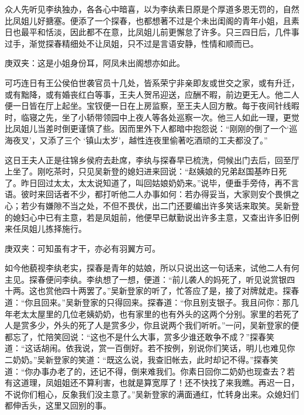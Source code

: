 \begin{parag}
    众人先听见李纨独办，各各心中暗喜，以为李纨素日原是个厚道多恩无罚的，自然比凤姐儿好搪塞。便添了一个探春，也都想著不过是个未出闺阁的青年小姐，且素日也最平和恬淡，因此都不在意，比凤姐儿前更懈怠了许多。只三四日后，几件事过手，渐觉探春精细处不让凤姐，只不过是言语安静，性情和顺而已。\begin{note}庚双夹：这是小姐身份耳，阿凤未出阁想亦如此。\end{note}可巧连日有王公侯伯世袭官员十几处，皆系荣宁非亲即友或世交之家，或有升迁，或有黜降，或有婚丧红白等事，王夫人贺吊迎送，应酬不暇，前边更无人。他二人便一日皆在厅上起坐。宝钗便一日在上房监察，至王夫人回方散。每于夜间针线暇时，临寝之先，坐了小轿带领园中上夜人等各处巡察一次。他三人如此一理，更觉比凤姐儿当差时倒更谨慎了些。因而里外下人都暗中抱怨说：“刚刚的倒了一个‘巡海夜叉’，又添了三个 ‘镇山太岁’，越性连夜里偷著吃酒顽的工夫都没了。”
\end{parag}


\begin{parag}
    这日王夫人正是往锦乡侯府去赴席，李纨与探春早已梳洗，伺候出门去后，回至厅上坐了。刚吃茶时，只见吴新登的媳妇进来回说：“赵姨娘的兄弟赵国基昨日死了。昨日回过太太，太太说知道了，叫回姑娘奶奶来。”说毕，便垂手旁侍，再不言语。彼时来回话者不少，都打听他二人办事如何：若办得妥当，大家则安个畏惧之心；若少有嫌隙不当之处，不但不畏伏，出二门还要编出许多笑话来取笑。吴新登的媳妇心中已有主意，若是凤姐前，他便早已献勤说出许多主意，又查出许多旧例来任凤姐儿拣择施行。\begin{note}庚双夹：可知虽有才干，亦必有羽翼方可。\end{note}如今他藐视李纨老实，探春是青年的姑娘，所以只说出这一句话来，试他二人有何主见。探春便问李纨。李纨想了一想，便道：“前儿袭人的妈死了，听见说赏银四十两。这也赏他四十两罢了。”吴新登家的听了，忙答应了是，接了对牌就走。探春道：“你且回来。”吴新登家的只得回来。探春道：“你且别支银子。我且问你：那几年老太太屋里的几位老姨奶奶，也有家里的也有外头的这两个分别。家里的若死了人是赏多少，外头的死了人是赏多少，你且说两个我们听听。”一问，吴新登家的便都忘了，忙陪笑回说：“这也不是什么大事，赏多少谁还敢争不成？”探春笑道：“这话胡闹。依我说，赏一百倒好。若不按例，别说你们笑话，明儿也难见你二奶奶。”吴新登家的笑道：“既这么说，我查旧帐去，此时却记不得。”探春笑道：“你办事办老了的，还记不得，倒来难我们。你素日回你二奶奶也现查去？若有这道理，凤姐姐还不算利害，也就是算宽厚了！还不快找了来我瞧。再迟一日，不说你们粗心，反象我们没主意了。”吴新登家的满面通红，忙转身出来。众媳妇们都伸舌头，这里又回别的事。
\end{parag}


